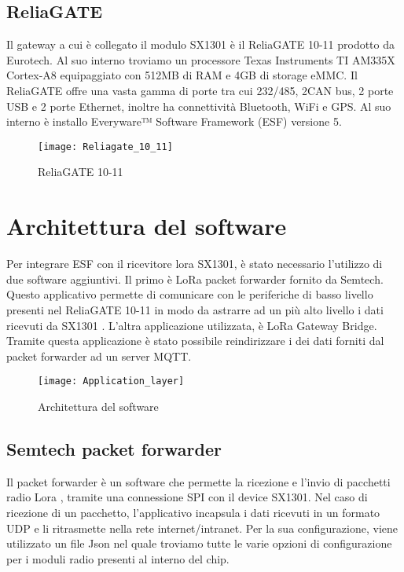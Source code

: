 \subsection{ReliaGATE}
Il gateway a cui è collegato il modulo SX1301 è il ReliaGATE 10-11 prodotto da
Eurotech. Al suo interno troviamo un processore Texas Instruments TI AM335X Cortex-A8 
equipaggiato con 512MB di RAM e 4GB di storage eMMC. Il ReliaGATE offre una
vasta gamma di porte tra cui 232/485, 2CAN bus, 2 porte USB e 2 porte Ethernet,
inoltre ha connettività Bluetooth, WiFi e GPS. Al suo interno è installo
Everyware™ Software Framework (ESF) versione 5.
\begin{figure}[th]
        \centering 
                \texttt{[image: Reliagate\_10\_11]}
        \caption{ReliaGATE 10-11}
        \label{fig:ReliaGATE}
\end{figure}



\section{Architettura del software}
Per integrare ESF con il ricevitore lora SX1301, è stato necessario l'utilizzo
di due software aggiuntivi.
Il primo è LoRa packet forwarder fornito da Semtech. Questo
applicativo permette di comunicare con le periferiche di basso livello presenti
nel ReliaGATE 10-11 in modo da astrarre ad un più alto livello i dati ricevuti da
SX1301 .
L'altra applicazione utilizzata, è LoRa Gateway Bridge. Tramite questa
applicazione è stato possibile 
reindirizzare i dei dati forniti dal packet forwarder ad un server MQTT.

\begin{figure}[th]
        \centering 
                \texttt{[image: Application\_layer]}
        \caption{Architettura del software}
        \label{fig:Software_stack}
\end{figure}

\subsection{Semtech packet forwarder}
Il packet forwarder è un software che permette la ricezione e l'invio di pacchetti radio Lora ,
tramite una connessione SPI con il device SX1301. Nel caso di ricezione di un
pacchetto, l'applicativo incapsula i dati ricevuti in un formato UDP e li
ritrasmette nella rete internet/intranet. Per la sua configurazione, viene
utilizzato un file Json nel quale troviamo tutte le varie opzioni di
configurazione per i moduli radio presenti al interno del chip.
\inputminted[mathescape, gobble=2, frame=lines, linenos=true
framesep=2mm, firstline=1,lastline=23]{json}{Code_Files/global_json.conf}
\inputminted[mathescape, gobble=2, frame=lines, linenos=true
framesep=2mm, firstline=173,lastline=184]{json}{Code_Files/global_json.conf}

